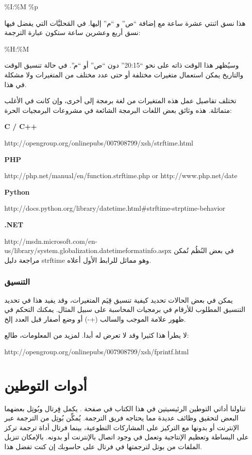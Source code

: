 \%I:\%M \%p

هذا نسق اثنتي عشرة ساعة مع إضافة “ص” و “م” إليها. في المَحليَّات التي
يفضل فيها نسق أربع وعشرين ساعة ستكون عبارة الترجمة:

\%H:\%M

وسيُظهر هذا الوقت ذاته على نحو “20:15” دون “ص” أو “م”. في حالة تنسيق
الوقت والتاريخ يمكن استعمال متغيرات مختلفة أو حتى عدد مختلف من
المتغيرات ولا مشكلة في هذا.

تختلف تفاصيل عمل هذه المتغيرات من لغة برمجة إلى أخرى، وإن كانت في الأغلب
متماثلة. هذه وثائق بعض اللغات البرمجة الشائعة في مشروعات البرمجيات
الحرة:

\startitemize[1]
\item {\bf
C / C++}

http://opengroup.org/onlinepubs/007908799/xsh/strftime.html
\item {\bf
PHP}

http://php.net/manual/en/function.strftime.php  or 
http://www.php.net/date
\item {\bf
Python}

http://docs.python.org/library/datetime.html\#strftime-strptime-behavior
\item {\bf
.NET}

http://msdn.microsoft.com/en-us/library/system.globalization.datetimeformatinfo.aspx
\stopitemize
في بعض النُظُم تُمكن مراجعة دليل strftime وهو مماثل للرابط الأول أعلاه.

\subsection{التنسيق}
يمكن في بعض الحالات تحديد كيفية تنسيق قِيَم المتغيرات، وقد يفيد هذا في
تحديد التنسيق المطلوب للأرقام في برمجيات المحاسبة على سبيل المثال.
يمكنك التحكم في ظهور علامة الموجب والسالب (+ -) أو وضع
أصفار قبل العدد إلخ.

لا يطرأ هذا كثيرا وقد لا تعرض له أبدا. لمزيد من المعلومات، طالع:

http://opengroup.org/onlinepubs/007908799/xsh/fprintf.html

\chapter{أدوات التوطين}
تناولنا أداتي التوطين الرئيسيتين
في هذا الكتاب في صفحة . يكمل فِِرتال وبُوتِل
بعضهما البعض لتحقيق وظائف عديدة مما يحتاجه فريق الترجمة. يُمكِّن بُوتِل
من الترجمة عبر الإنترنت أو بدونها مع التركيز على المشاركات التطوعية،
بينما فرتال أداة ترجمة تركز على البساطة وتعظيم الإنتاجية وتعمل في وجود
اتصال بالإنترنت أو بدونه. بالإمكان تنزيل الملفات من بوتل لترجمتها في
فرتال على حاسوبك إن كنت تفضل هذا.

